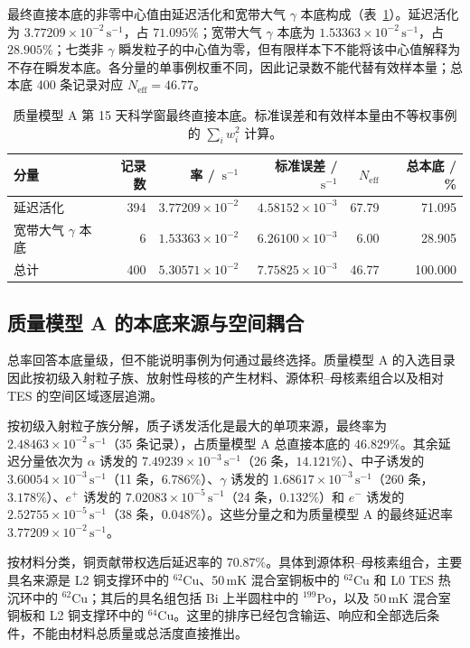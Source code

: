 \documentclass[11pt]{article}
\newcommand{\revblue}[1]{\textcolor{revisionblue}{#1}}
\newcommand{\cps}{\,\mathrm{s^{-1}}}
\begin{document}
最终直接本底的非零中心值由延迟活化和宽带大气 $\gamma$ 本底构成（表~\ref{tab:reference_background_budget_zh}）。延迟活化为 $3.77209\times10^{-2}\cps$，占 $71.095\%$；宽带大气 $\gamma$ 本底为 $1.53363\times10^{-2}\cps$，占 $28.905\%$；\revblue{七类非 $\gamma$ 瞬发粒子}的中心值为零，但有限样本下不能将该中心值解释为不存在瞬发本底。各分量的单事例权重不同，因此记录数不能代替有效样本量；总本底 400 条记录对应 $N_{\mathrm{eff}}=46.77$。

\begin{table}[H]
\centering
\caption{质量模型 A 第 15 天科学窗最终直接本底。标准误差和有效样本量由不等权事例的 $\sum_i w_i^2$ 计算。}
\label{tab:reference_background_budget_zh}
\footnotesize
\begin{tabular}{lrrrrr}
\toprule
分量 & 记录数 & 率 / $\cps$ & 标准误差 / $\cps$ & $N_{\mathrm{eff}}$ & 总本底 / \% \\
\midrule
延迟活化 & 394 & $3.77209\times10^{-2}$ & $4.58152\times10^{-3}$ & 67.79 & 71.095 \\
宽带大气 $\gamma$ 本底 & 6 & $1.53363\times10^{-2}$ & $6.26100\times10^{-3}$ & 6.00 & 28.905 \\
\midrule
总计 & 400 & $5.30571\times10^{-2}$ & $7.75825\times10^{-3}$ & 46.77 & 100.000 \\
\bottomrule
\end{tabular}
\end{table}

\subsection{质量模型 A 的本底来源与空间耦合}
\label{subsec:mass_model_a_origins_zh}

总率回答本底量级，但不能说明事例为何通过最终选择。质量模型 A 的入选目录因此按初级入射粒子族、放射性母核的产生材料、源体积--母核素组合以及相对 TES 的空间区域逐层追溯。

按初级入射粒子族分解，质子诱发活化是最大的单项来源，最终率为 $2.48463\times10^{-2}\cps$（35 条记录），占质量模型 A 总直接本底的 $46.829\%$。其余延迟分量依次为 $\alpha$ 诱发的 $7.49239\times10^{-3}\cps$（26 条，$14.121\%$）、中子诱发的 $3.60054\times10^{-3}\cps$（11 条，$6.786\%$）、$\gamma$ 诱发的 $1.68617\times10^{-3}\cps$（260 条，$3.178\%$）、$e^+$ 诱发的 $7.02083\times10^{-5}\cps$（24 条，$0.132\%$）和 $e^-$ 诱发的 $2.52755\times10^{-5}\cps$（38 条，$0.048\%$）。这些分量之和为质量模型 A 的最终延迟率 $3.77209\times10^{-2}\cps$。

按材料分类，铜贡献带权选后延迟率的 $70.87\%$。具体到源体积--母核素组合，主要具名来源是 L2 铜支撑环中的 $^{62}$Cu、50\,mK 混合室铜板中的 $^{62}$Cu 和 L0 TES 热沉环中的 $^{62}$Cu；其后的具名组包括 Bi 上半圆柱中的 $^{199}$Po，以及 50\,mK 混合室铜板和 L2 铜支撑环中的 $^{64}$Cu。这里的排序已经包含输运、响应和全部选后条件，不能由材料总质量或总活度直接推出。
\end{document}
